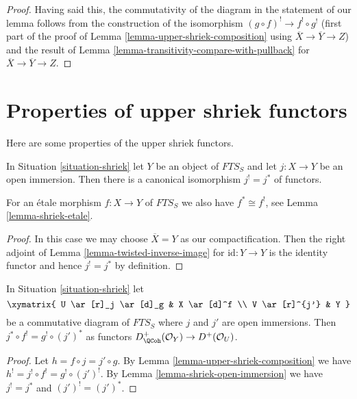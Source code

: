 \begin{proof}
\medskip\noindent
Having said this, the commutativity of the diagram in the statement
of our lemma follows from the construction of the isomorphism
$(g \circ f)^! \to f^! \circ g^!$ (first part of the proof of
Lemma \ref{lemma-upper-shriek-composition} using
$\overline{X} \to \overline{Y} \to Z$) and the result
of Lemma \ref{lemma-transitivity-compare-with-pullback}
for $\overline{X} \to \overline{Y} \to Z$.
\end{proof}



\section{Properties of upper shriek functors}
\label{section-upper-shriek-properties}

\noindent
Here are some properties of the upper shriek functors.

\begin{lemma}
\label{lemma-shriek-open-immersion}
In Situation \ref{situation-shriek} let $Y$ be an object
of $\textit{FTS}_S$ and let $j : X \to Y$ be an open immersion.
Then there is a canonical isomorphism $j^! = j^*$ of functors.
\end{lemma}

\noindent
For an \'etale morphism $f : X \to Y$ of $\textit{FTS}_S$
we also have $f^* \cong f^!$, see Lemma \ref{lemma-shriek-etale}.

\begin{proof}
In this case we may choose $\overline{X} = Y$ as our compactification.
Then the
right adjoint of Lemma \ref{lemma-twisted-inverse-image} for
$\text{id} : Y \to Y$ is the
identity functor and hence $j^! = j^*$ by definition.
\end{proof}

\begin{lemma}
\label{lemma-restrict-before-or-after}
In Situation \ref{situation-shriek} let
$$
\xymatrix{
U \ar[r]_j \ar[d]_g & X \ar[d]^f \\
V \ar[r]^{j'} & Y
}
$$
be a commutative diagram of $\textit{FTS}_S$ where $j$ and $j'$ are
open immersions. Then $j^* \circ f^! = g^! \circ (j')^*$ as functors
$D^+_\QCoh(\mathcal{O}_Y) \to D^+(\mathcal{O}_U)$.
\end{lemma}

\begin{proof}
Let $h = f \circ j = j' \circ g$. By
Lemma \ref{lemma-upper-shriek-composition} we have
$h^! = j^! \circ f^! = g^! \circ (j')^!$. By
Lemma \ref{lemma-shriek-open-immersion}
we have $j^! = j^*$ and $(j')^! = (j')^*$.
\end{proof}

